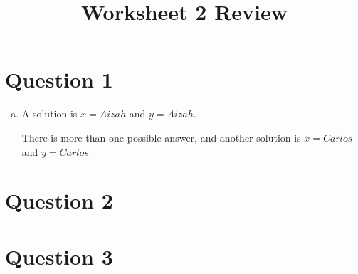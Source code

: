 \documentclass[12pt]{article}
\begin{document}
\title{Worksheet 2 Review}
\maketitle

\section*{Question 1}
\begin{enumerate}[a.]
    \item

    A solution is $x = Aizah$ and $y = Aizah$.

    \bigskip

    There is more than one possible answer, and another solution is $x = Carlos$
    and $y = Carlos$
\end{enumerate}

\section*{Question 2}

\section*{Question 3}
\end{document}
